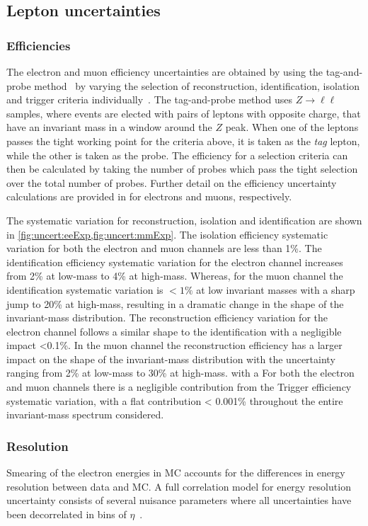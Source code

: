 \subsection{Lepton uncertainties}

\subsubsection{Efficiencies}
The electron and muon efficiency uncertainties are obtained by using the tag-and-probe method~\cite{Aaboud:2016vfy,Aad:2016jkr} by varying the selection of reconstruction, identification, isolation and trigger criteria individually~\cite{Aad:2019tso,Aad:2016jkr}. The tag-and-probe method uses $Z\rightarrow \ell\ell$ samples, where events are elected with pairs of leptons with opposite charge, that have an invariant mass in a window around the $Z$ peak. When one of the leptons passes the tight working point for the criteria above, it is taken as the \emph{tag} lepton, while the other is taken as the probe. The efficiency for a selection criteria can then be calculated by taking the number of probes which pass the tight selection over the total number of probes. Further detail on the efficiency uncertainty calculations are provided in \cite{Aad:2019tso,Aad:2016jkr} for electrons and muons, respectively. 

The systematic variation for reconstruction, isolation and identification are shown in \cref{fig:uncert:eeExp,fig:uncert:mmExp}. The isolation efficiency systematic variation for both the electron and muon channels are less than 1\%. The identification efficiency systematic variation for the electron channel increases from 2\% at low-mass to 4\% at high-mass. Whereas, for the muon channel the identification systematic variation is $< 1\%$ at low invariant masses with a sharp jump to 20\% at high-mass, resulting in a dramatic change in the shape of the invariant-mass distribution. The reconstruction efficiency variation for the electron channel follows a similar shape to the identification with a negligible impact <0.1\%. In the muon channel the reconstruction efficiency has a larger impact on the shape of the invariant-mass distribution with the uncertainty ranging from 2\% at low-mass to 30\% at high-mass. with a For both the electron and muon channels there is a negligible contribution from the Trigger efficiency systematic variation, with a flat contribution < 0.001\% throughout the entire invariant-mass spectrum considered. 

\subsubsection{Resolution}
Smearing of the electron energies in MC accounts for the differences in energy resolution between data and MC. A full correlation model for energy resolution uncertainty consists of several nuisance parameters where all uncertainties have been decorrelated in bins of $\eta$~\cite{Aad:2019tso}.


